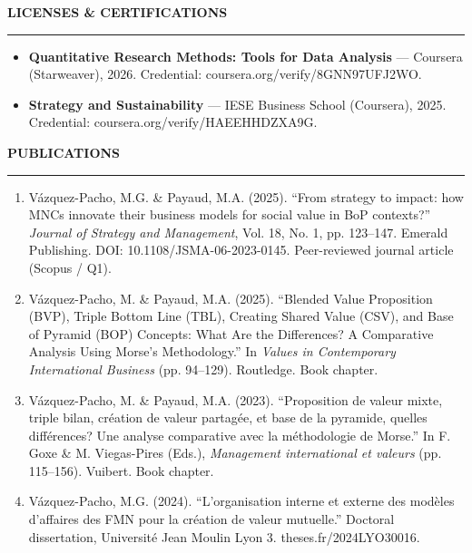\documentclass[10pt,a4paper]{article}
\newcommand{\cvsection}[1]{%
  \vspace{0.6em}%
  {\large\bfseries #1}\par
  \vspace{-0.45em}%
  \rule{\textwidth}{0.6pt}\par
  \vspace{0.25em}%
}
\begin{document}
\cvsection{LICENSES \& CERTIFICATIONS}
\begin{itemize}
  \item \textbf{Quantitative Research Methods: Tools for Data Analysis} --- Coursera (Starweaver), 2026. Credential: coursera.org/verify/8GNN97UFJ2WO.
  \item \textbf{Strategy and Sustainability} --- IESE Business School (Coursera), 2025. Credential: coursera.org/verify/HAEEHHDZXA9G.
\end{itemize}

\cvsection{PUBLICATIONS}
\begin{enumerate}
  \item V\'azquez-Pacho, M.G. \& Payaud, M.A. (2025). ``From strategy to impact: how MNCs innovate their business models for social value in BoP contexts?'' \textit{Journal of Strategy and Management}, Vol. 18, No. 1, pp. 123--147. Emerald Publishing. DOI: 10.1108/JSMA-06-2023-0145. Peer-reviewed journal article (Scopus / Q1).
  \item V\'azquez-Pacho, M. \& Payaud, M.A. (2025). ``Blended Value Proposition (BVP), Triple Bottom Line (TBL), Creating Shared Value (CSV), and Base of Pyramid (BOP) Concepts: What Are the Differences? A Comparative Analysis Using Morse's Methodology.'' In \textit{Values in Contemporary International Business} (pp. 94--129). Routledge. Book chapter.
  \item V\'azquez-Pacho, M. \& Payaud, M.A. (2023). ``Proposition de valeur mixte, triple bilan, cr\'eation de valeur partag\'ee, et base de la pyramide, quelles diff\'erences? Une analyse comparative avec la m\'ethodologie de Morse.'' In F. Goxe \& M. Viegas-Pires (Eds.), \textit{Management international et valeurs} (pp. 115--156). Vuibert. Book chapter.
  \item V\'azquez-Pacho, M.G. (2024). ``L'organisation interne et externe des mod\`eles d'affaires des FMN pour la cr\'eation de valeur mutuelle.'' Doctoral dissertation, Universit\'e Jean Moulin Lyon 3. theses.fr/2024LYO30016.
\end{enumerate}
\end{document}
